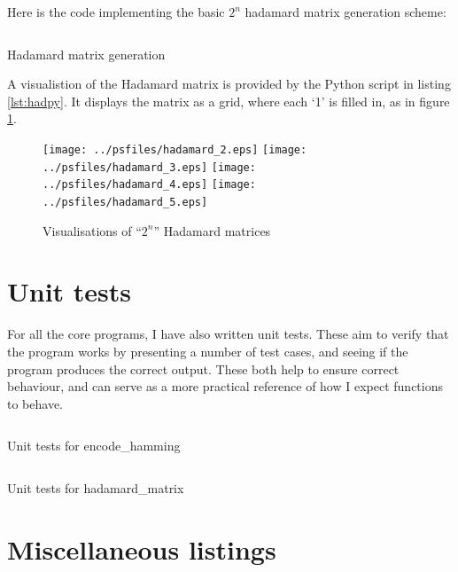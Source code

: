 \documentclass[a4paper,11pt]{article}
\newenvironment{longlisting}
{\addvspace{\baselineskip}\captionsetup{type=listing}}
{\addvspace{\baselineskip}}
\begin{document}
    Here is the code implementing the basic $2^n$ hadamard matrix generation
    scheme:

\begin{longlisting}
\inputminted{python}{../src/hadamard_matrix.py}
\caption{Hadamard matrix generation}
\end{longlisting}



    A visualistion of the Hadamard matrix is provided by the Python script in
    listing \ref{lst:hadpy}. It displays the matrix as a grid, where each `1' is
    filled in, as in figure \ref{fig:hadvis}.

\begin{figure}[H]
\begin{center}
\texttt{[image: ../psfiles/hadamard\_2.eps]}
\texttt{[image: ../psfiles/hadamard\_3.eps]}
\texttt{[image: ../psfiles/hadamard\_4.eps]}
\texttt{[image: ../psfiles/hadamard\_5.eps]}
\end{center}
\caption{Visualisations of ``$2^n$'' Hadamard matrices}\label{fig:hadvis}
\end{figure}

    \section{Unit tests}

    For all the core programs, I have also written unit tests. These aim to
    verify that the program works by presenting a number of test cases, and
    seeing if the program produces the correct output. These both help to ensure
    correct behaviour, and can serve as a more practical reference of how I
    expect functions to behave.

\begin{longlisting}
\inputminted{python}{../src/test_encode_hamming.py}
\caption{Unit tests for encode\_hamming}\label{lst:testhammingbin}
\end{longlisting}

\begin{longlisting}
\inputminted{python}{../src/test_hadamard_matrix.py}
\caption{Unit tests for hadamard\_matrix}\label{lst:testhadamardmat}
\end{longlisting}

    \section{Miscellaneous listings}
\end{document}
